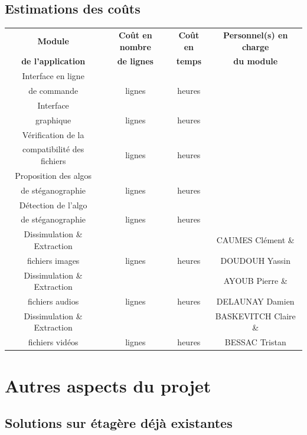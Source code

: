 \documentclass[11pt]{article}
\begin{document}
\subsection{Estimations des coûts}
\small
\begin{tabular}{|c|c|c|c|}
  \hline
  \textbf{Module} & \textbf{Coût en nombre} & \textbf{Coût en} & \textbf{Personnel(s) en charge} \\
   \textbf{de l'application} & \textbf{de lignes} & \textbf{temps} & \textbf{du module} \\
  \hline
    Interface en ligne &  &  &  \\ 
    de commande & lignes & heures & \\
  \hline
  Interface &  &  &  \\
  graphique & lignes & heures & \\
  \hline
  Vérification de la &  &  &  \\
   compatibilité des fichiers & lignes & heures & \\
  \hline
    Proposition des algos &  &  &  \\
   de stéganographie & lignes & heures & \\
  \hline
    Détection de l'algo &  &  &  \\
   de stéganographie & lignes & heures & \\
  \hline
  Dissimulation \& Extraction &  &  & CAUMES Clément \& \\
   fichiers images & lignes & heures & DOUDOUH Yassin \\
  \hline
  Dissimulation \& Extraction &  &  & AYOUB Pierre \& \\
   fichiers audios & lignes & heures & DELAUNAY Damien \\
     \hline
  Dissimulation \& Extraction &  &  & BASKEVITCH Claire \& \\
   fichiers vidéos & lignes & heures & BESSAC Tristan \\
  \hline
\end{tabular}
\small

\section{Autres aspects du projet}

\subsection{Solutions sur étagère déjà existantes}
\end{document}
